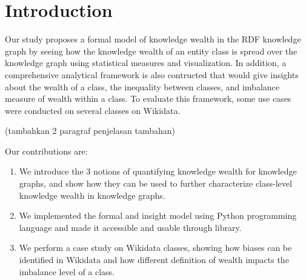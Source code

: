 \section{Introduction}


Our study proposes a formal model of knowledge wealth in the RDF knowledge graph by seeing how the knowledge wealth of an entity class is spread over the knowledge graph using statistical measures and visualization. In addition, a comprehensive analytical framework is also contructed that would give insights about the wealth of a class, the inequality between classes, and imbalance measure of wealth within a class. To evaluate this framework, some use cases were conducted on several classes on Wikidata.

(tambahkan 2 paragraf penjelasan tambahan)

Our contributions are:
\begin{enumerate}
    \item We introduce the 3 notions of quantifying knowledge wealth for knowledge graphs, and show how they can be used to further characterize class-level knowledge wealth in knowledge graphs.
    \item We implemented the formal and insight model using Python programming language and made it accessible and usable through library.
    \item We perform a case study on Wikidata classes, showing how biases can be identified in Wikidata and how different definition of wealth impacts the imbalance level of a class.
\end{enumerate}
